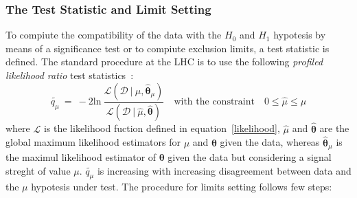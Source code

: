 \subsubsection{The Test Statistic and Limit Setting}
To compiute the compatibility of the data with the $H_{0}$ and $H_{1}$ hypotesis by means of a significance test or
to compiute exclusion limits, a test statistic is defined. 
The standard procedure at the LHC is to use the following \emph{profiled likelihood ratio} test statistics~\cite{Asympt}: 
\begin{equation}
\tilde{q_{\mu}} ~ = ~ -2 \text{ln} ~ \frac{\mathcal{L}(\mathcal{D}~|~\mu, \hat{\boldsymbol{\theta}}_{\mu})}{\mathcal{L}(\mathcal{D} ~| ~ 
\hat{\mu}, \hat{\boldsymbol{\theta}})}
\quad \text{with the constraint} \quad 0 \leq \hat{\mu} \leq \mu
\end{equation}
 where $\mathcal{L}$ is the likelihood fuction defined in equation~\eqref{likelihood}, $\hat{\mu}$ and $\hat{\boldsymbol{\theta}}$ 
are the global maximum likelihood estimators for $\mu$ and $\boldsymbol{\theta}$ given the data, 
whereas $\hat{\boldsymbol{\theta}}_{\mu}$ is the maximul likelihood estimator of $\boldsymbol{\theta}$ given the data but considering
a signal streght of value $\mu$. $\tilde{q_{\mu}}$ is increasing with 
increasing disagreement between data and the $\mu$ hypotesis under test.
The procedure for limits setting follows few steps:
